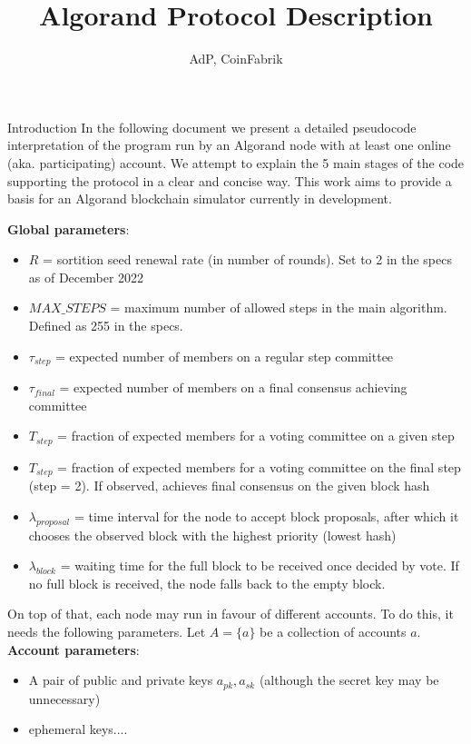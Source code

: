 \documentclass[10pt,a4paper]{article}
\author{AdP, CoinFabrik}
\title{Algorand Protocol Description}
\begin{document}
\maketitle
\tableofcontents

\begin{section}{Introduction}
In the following document we present a detailed pseudocode interpretation 
of the program run by an Algorand node with at least one online (aka. 
participating)
account. We attempt to explain the 5 main stages of the code supporting 
the protocol in a clear and concise way.
This work aims to provide a basis for an Algorand blockchain simulator 
currently in development. \newline

\noindent \textbf{Global parameters}:
\begin{itemize}
    \item $R$ = sortition seed renewal rate (in number of rounds). Set to 2 in the specs
    as of December 2022
    \item $MAX\_STEPS$ = maximum number of allowed steps in the main algorithm. Defined 
    as 255 in the specs.
    \item $\tau_{step}$ = expected number of members on a regular step committee
    \item $\tau_{final}$ = expected number of members on a final consensus achieving committee
    \item $T_{step}$ = fraction of expected members for a voting committee on a given step
    \item $T_{step}$ = fraction of expected members for a voting committee on the final step (step = 2). If observed,
    achieves final consensus on the given block hash
    \item $\lambda_{proposal}$ = time interval for the node to accept block proposals, after
    which it chooses the observed block with the highest priority (lowest hash) 
    \item $\lambda_{block}$ = waiting time for the full block to be received once decided by vote.
    If no full block is received, the node falls back to the empty block.
  \end{itemize}

On top of that, each node may run in favour of different accounts. To do this,
it needs the following parameters. 
Let $A=\{a\}$ be a collection of accounts $a$.
\noindent \textbf{Account parameters}:
\begin{itemize}
    \item A pair of public and private keys $a_{pk}, a_{sk}$ (although the secret key may be unnecessary)
    \item ephemeral keys....
\end{itemize}

\end{section}
\end{document}
